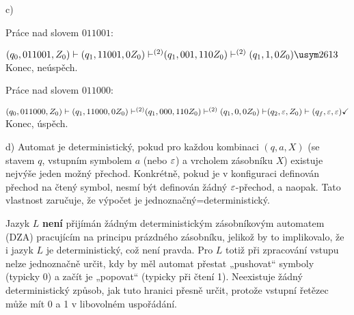 c) 

\begin{multicols}{2} 

    Práce nad slovem $011001$: 

    $
    {(q_0, 011001, Z_0) \vdash (q_1, 11001, 0Z_0) \vdash^{(2)} }\\
    {(q_1, 001, 110Z_0) \vdash^{(2)} (q_1, 1, 0Z_0)} \xmark\\
    $Konec, neúspěch.

    Práce nad slovem $011000$: 

    $
    {(q_0, 011000, Z_0) \vdash (q_1, 11000, 0Z_0) \vdash^{(2)}}\\
    {(q_1, 000, 110Z_0) \vdash^{(2)} (q_1, 0, 0Z_0) \vdash}\\
    {(q_2, \varepsilon, Z_0) \vdash (q_f, \varepsilon, \varepsilon)} \checkmark\\
    $Konec, úspěch.

\end{multicols}

d) Automat je deterministický, pokud pro každou kombinaci $(q, a, X)$ (se stavem $q$, vstupním symbolem $a$ (nebo $\varepsilon$)
a vrcholem zásobníku $X$) existuje nejvýše jeden možný přechod. Konkrétně, pokud je v konfiguraci definován přechod na 
čtený symbol, nesmí být definován žádný $\varepsilon$-přechod, a naopak. Tato vlastnost zaručuje, že výpočet je 
jednoznačný=deterministický.

Jazyk $L$ \textbf{není} přijímán žádným deterministickým zásobníkovým automatem (DZA) pracujícím na principu prázdného zásobníku, 
jelikož by to implikovalo, že i jazyk $L$ je deterministický, což není pravda. Pro $L$ totiž při zpracování vstupu nelze 
jednoznačně určit, kdy by měl automat přestat „pushovat“ symboly (typicky 0) a začít je „popovat“ (typicky při čtení 1). 
Neexistuje žádný deterministický způsob, jak tuto hranici přesně určit, protože vstupní řetězec může mít 0 a 1 v 
libovolném uspořádání.
